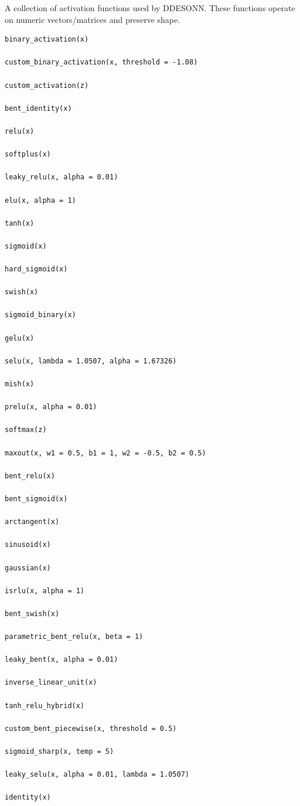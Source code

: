 \documentclass[a4paper]{book}
\begin{document}
%
\begin{Description}
A collection of activation functions used by DDESONN.
These functions operate on numeric vectors/matrices and preserve shape.
\end{Description}
%
\begin{Usage}
\begin{verbatim}
binary_activation(x)

custom_binary_activation(x, threshold = -1.08)

custom_activation(z)

bent_identity(x)

relu(x)

softplus(x)

leaky_relu(x, alpha = 0.01)

elu(x, alpha = 1)

tanh(x)

sigmoid(x)

hard_sigmoid(x)

swish(x)

sigmoid_binary(x)

gelu(x)

selu(x, lambda = 1.0507, alpha = 1.67326)

mish(x)

prelu(x, alpha = 0.01)

softmax(z)

maxout(x, w1 = 0.5, b1 = 1, w2 = -0.5, b2 = 0.5)

bent_relu(x)

bent_sigmoid(x)

arctangent(x)

sinusoid(x)

gaussian(x)

isrlu(x, alpha = 1)

bent_swish(x)

parametric_bent_relu(x, beta = 1)

leaky_bent(x, alpha = 0.01)

inverse_linear_unit(x)

tanh_relu_hybrid(x)

custom_bent_piecewise(x, threshold = 0.5)

sigmoid_sharp(x, temp = 5)

leaky_selu(x, alpha = 0.01, lambda = 1.0507)

identity(x)
\end{verbatim}
\end{Usage}
\end{document}
